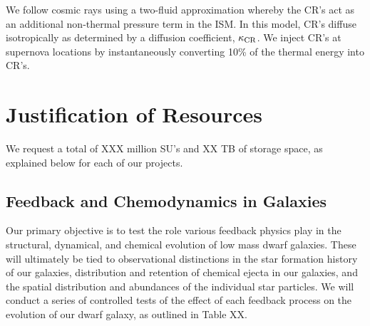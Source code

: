 \documentclass[11pt]{article}
\begin{document}
We follow cosmic rays using a two-fluid approximation \citep{SalemBryan2014, SalemBryanHummels, SalemBryanCorlies} whereby the CR's act as an additional non-thermal pressure term in the ISM. In this model, CR's diffuse isotropically as determined by a diffusion coefficient, $\kappa_{\rm CR}$. We inject CR's at supernova locations by instantaneously converting 10\% of the thermal energy into CR's. 

\section{Justification of Resources}

We request a total of XXX million SU's and XX TB of storage space, as explained below for each of our projects.

\subsection{Feedback and Chemodynamics in Galaxies}

Our primary objective is to test the role various feedback physics play in the structural, dynamical, and chemical evolution of low mass dwarf galaxies. These will ultimately be tied to observational distinctions in the star formation history of our galaxies, distribution and retention of chemical ejecta in our galaxies, and the spatial distribution and abundances of the individual star particles. We will conduct a series of controlled tests of the effect of each feedback process on the evolution of our dwarf galaxy, as outlined in Table XX. 
\end{document}
